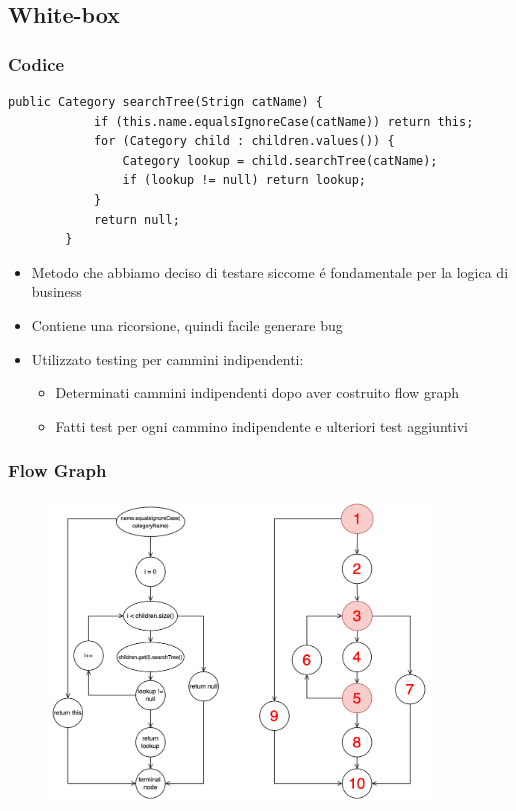 \subsection{White-box}
\beamertitle
 \begin{frame} [fragile]
     \frametitle{Codice}
     \begin{lstlisting}[autogobble, title={\texttt{Category.java}}]
        public Category searchTree(Strign catName) {
            if (this.name.equalsIgnoreCase(catName)) return this;
            for (Category child : children.values()) {
                Category lookup = child.searchTree(catName);
                if (lookup != null) return lookup;
            }
            return null;
        }
     \end{lstlisting}
     \begin{itemize}
         \item Metodo che abbiamo deciso di testare siccome é fondamentale per la logica di business
         \item Contiene una ricorsione, quindi facile generare bug
         \item Utilizzato testing per cammini indipendenti:
           \begin{itemize}
               \item Determinati cammini indipendenti dopo aver costruito flow graph
               \item Fatti test per ogni cammino indipendente e ulteriori test aggiuntivi
           \end{itemize}
     \end{itemize}
 \end{frame}

 \begin{frame}
     \frametitle{Flow Graph}
     \begin{figure}
         \includegraphics[width=0.9\textwidth]{img/flowGraphSearchTree.png}
     \end{figure}
 \end{frame}


